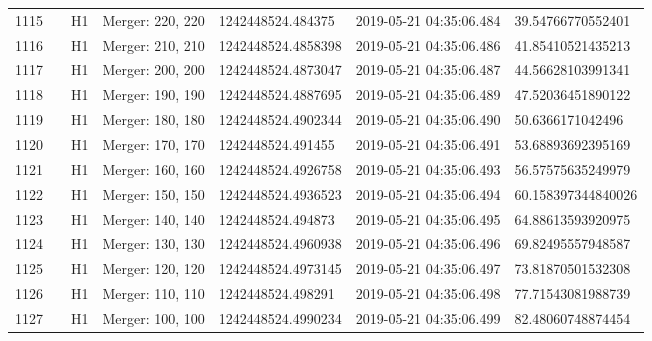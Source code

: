 \begin{longtable}{lllllll}
1115 &                                                    &       H1 &  Merger: 220, 220 &   1242448524.484375 &  2019-05-21 04:35:06.484 &   39.54766770552401 \\
1116 &                                                    &       H1 &  Merger: 210, 210 &  1242448524.4858398 &  2019-05-21 04:35:06.486 &   41.85410521435213 \\
1117 &                                                    &       H1 &  Merger: 200, 200 &  1242448524.4873047 &  2019-05-21 04:35:06.487 &   44.56628103991341 \\
1118 &                                                    &       H1 &  Merger: 190, 190 &  1242448524.4887695 &  2019-05-21 04:35:06.489 &   47.52036451890122 \\
1119 &                                                    &       H1 &  Merger: 180, 180 &  1242448524.4902344 &  2019-05-21 04:35:06.490 &    50.6366171042496 \\
1120 &                                                    &       H1 &  Merger: 170, 170 &   1242448524.491455 &  2019-05-21 04:35:06.491 &   53.68893692395169 \\
1121 &                                                    &       H1 &  Merger: 160, 160 &  1242448524.4926758 &  2019-05-21 04:35:06.493 &   56.57575635249979 \\
1122 &                                                    &       H1 &  Merger: 150, 150 &  1242448524.4936523 &  2019-05-21 04:35:06.494 &  60.158397344840026 \\
1123 &                                                    &       H1 &  Merger: 140, 140 &   1242448524.494873 &  2019-05-21 04:35:06.495 &   64.88613593920975 \\
1124 &                                                    &       H1 &  Merger: 130, 130 &  1242448524.4960938 &  2019-05-21 04:35:06.496 &   69.82495557948587 \\
1125 &                                                    &       H1 &  Merger: 120, 120 &  1242448524.4973145 &  2019-05-21 04:35:06.497 &   73.81870501532308 \\
1126 &                                                    &       H1 &  Merger: 110, 110 &   1242448524.498291 &  2019-05-21 04:35:06.498 &   77.71543081988739 \\
1127 &                                                    &       H1 &  Merger: 100, 100 &  1242448524.4990234 &  2019-05-21 04:35:06.499 &   82.48060748874454 \\

\end{longtable}

